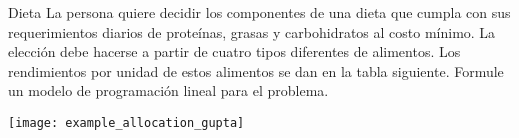 \begin{frameExample}{Dieta}{}
  La persona quiere decidir los componentes de una dieta que cumpla con sus requerimientos diarios de proteínas, grasas y carbohidratos al costo mínimo. La elección debe hacerse a partir de cuatro tipos diferentes de alimentos. Los rendimientos por unidad de estos alimentos se dan en la tabla siguiente. Formule un modelo de programación lineal para el problema.
  
  {\centering
\texttt{[image: example\_allocation\_gupta]}
\par}

  
\end{frameExample}



